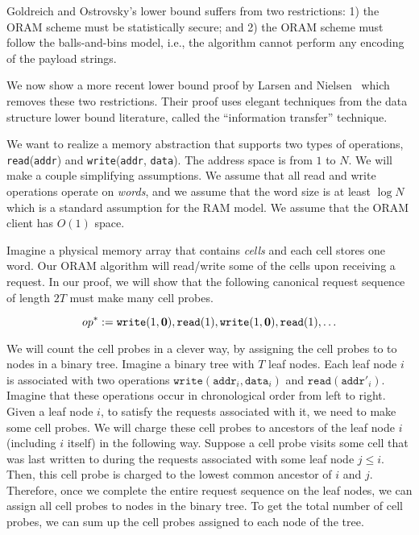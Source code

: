 Goldreich and Ostrovsky's lower bound suffers from two restrictions:
1) the ORAM scheme must be statistically secure; and 2) 
the ORAM scheme must follow the balls-and-bins model, i.e.,
the algorithm cannot perform any encoding of the payload strings.

We now 
show a more recent lower bound proof 
by Larsen  
and Nielsen~\cite{larsen18lowerbound} which removes these two restrictions.
Their proof uses elegant 
techniques from the data structure lower bound literature,
called the ``information transfer'' technique.



We want to realize a memory abstraction
that supports two types of operations, 
\texttt{read}(\texttt{addr}) and \texttt{write}(\texttt{addr}, \texttt{data}).
The address space is from $1$ to $N$.
We will make a couple simplifying assumptions. 
We assume that all read and write operations
operate on {\it words}, and we assume 
that the word size is at least $\log N$ which is a standard
assumption for the RAM model.
We assume that the ORAM client has $O(1)$ space. 

Imagine a physical memory array that contains {\it cells}
and each cell stores one word. 
Our ORAM algorithm 
will read/write  
some of the cells upon receiving a request.
In our proof, we will show that the following canonical 
request sequence of length $2T$ 
must make many cell probes.

\[op^* := \texttt{write}(1, {\bf 0}), \texttt{read}(1), 
\texttt{write}(1, {\bf 0}), \texttt{read}(1), \ldots\]


We will count the cell probes in a clever way, by assigning
the cell probes to 
to nodes in a binary tree. 
Imagine a binary tree with $T$ leaf nodes.
Each leaf node $i$ is associated with two operations
$\texttt{write}(\texttt{addr}_i, \texttt{data}_i)$
and $\texttt{read}(\texttt{addr}'_i)$.
Imagine that these operations 
occur in chronological order from left to right. 
Given a leaf node $i$, 
to satisfy the requests associated with it,
we need to make some cell probes.
We will charge these cell probes 
to ancestors of the leaf node $i$ (including $i$ itself) in the following way. 
Suppose a cell probe  
visits some cell that was last  
written to during the 
requests associated with some leaf node $j \leq i$.
Then, this cell probe is charged to the 
lowest common 
ancestor of $i$ and $j$.
Therefore, once we complete the entire request sequence
on the leaf nodes, we can assign all cell probes
to nodes in the binary tree.
To get the total number of cell probes, we can sum
up the cell probes assigned to each node of the tree.

